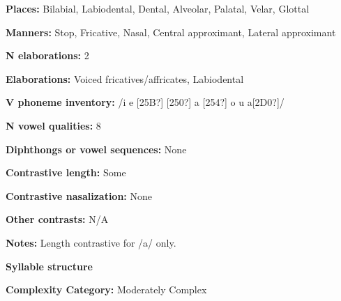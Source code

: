\begin{styleBody}
\textbf{Places:} Bilabial, Labiodental, Dental, Alveolar, Palatal, Velar, Glottal
\end{styleBody}

\begin{styleBody}
\textbf{Manners:} Stop, Fricative, Nasal, Central approximant, Lateral approximant
\end{styleBody}

\begin{styleBody}
\textbf{N elaborations:} 2
\end{styleBody}

\begin{styleBody}
\textbf{Elaborations:} Voiced fricatives/affricates, Labiodental
\end{styleBody}

\begin{styleBody}
\textbf{V phoneme inventory:} /i e [25B?] [250?] a [254?] o u a[2D0?]/
\end{styleBody}

\begin{styleBody}
\textbf{N vowel qualities:} 8
\end{styleBody}

\begin{styleBody}
\textbf{Diphthongs or vowel sequences:} None
\end{styleBody}

\begin{styleBody}
\textbf{Contrastive length:} Some
\end{styleBody}

\begin{styleBody}
\textbf{Contrastive nasalization:} None
\end{styleBody}

\begin{styleBody}
\textbf{Other contrasts:} N/A
\end{styleBody}

\begin{styleBody}
\textbf{Notes:} Length contrastive for /a/ only.
\end{styleBody}

\begin{styleBody}
\textbf{Syllable structure}
\end{styleBody}

\begin{styleBody}
\textbf{Complexity Category:} Moderately Complex
\end{styleBody}

